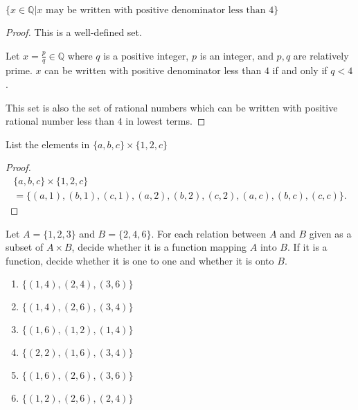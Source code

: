 \begin{exercise}
    $\{ x\in\mathbb{Q} \vert \text{$x$ may be written with positive denominator less than $4$} \}$
\end{exercise}

\begin{proof}
    This is a well-defined set.

    Let $x = \frac{p}{q}\in\mathbb{Q}$ where $q$ is a positive integer, $p$ is an integer, and $p, q$ are relatively prime. $x$ can be written with positive denominator less than $4$ if and only if $q < 4$.

    This set is also the set of rational numbers which can be written with positive rational number less than $4$ in lowest terms.
\end{proof}

\begin{exercise}
    List the elements in $\{ a, b, c \} \times \{ 1, 2, c \}$
\end{exercise}

\begin{proof}
    \begin{multline*}
        \{ a, b, c \} \times \{ 1, 2, c \} \\
        = \{ (a, 1), (b, 1), (c, 1), (a, 2), (b, 2), (c, 2), (a, c), (b, c), (c, c) \}.
    \end{multline*}
\end{proof}

\begin{exercise}
    Let $A = \{ 1, 2, 3 \}$ and $B = \{ 2, 4, 6 \}$. For each relation between $A$ and $B$ given as a subset of $A\times B$, decide whether it is a function mapping $A$ into $B$. If it is a function, decide whether it is one to one and whether it is onto $B$.
    \begin{enumerate}[label={\textbf{\alph*.}},itemsep=0pt]
        \item $\{ (1, 4), (2, 4), (3, 6) \}$
        \item $\{ (1, 4), (2, 6), (3, 4) \}$
        \item $\{ (1, 6), (1, 2), (1, 4) \}$
        \item $\{ (2, 2), (1, 6), (3, 4) \}$
        \item $\{ (1, 6), (2, 6), (3, 6) \}$
        \item $\{ (1, 2), (2, 6), (2, 4) \}$
    \end{enumerate}
\end{exercise}

